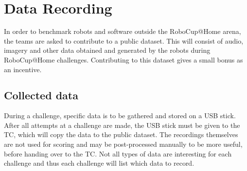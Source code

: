 \section{Data Recording}
  \label{rule:datarecording}
  In order to benchmark robots and software outside the RoboCup@Home arena, the teams are asked to contribute to a public dataset.
  This will consist of audio, imagery and other data obtained and generated by the robots during RoboCup@Home challenges.
  Contributing to this dataset gives a small bonus as an incentive. 
  
  \subsection{Collected data}
    During a challenge, specific data is to be gathered and stored on a USB stick. 
    After all attempts at a challenge are made, the USB stick must be given to the TC, which will copy the data to the public dataset.
    The recordings themselves are not used for scoring and may be post-processed manually to be more useful, before handing over to the TC. 
    Not all types of data are interesting for each challenge and thus each challenge will list which data to record. 
    
